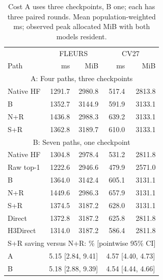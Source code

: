 \begin{table}[t]\centering\footnotesize
\caption{Cost A uses three checkpoints, B one; each has three paired rounds. Mean population-weighted ms; observed peak allocated MiB with both models resident.}\label{tab:cost}
\setlength{\tabcolsep}{4pt}\renewcommand{\arraystretch}{1.03}
\begin{tabular}{@{}lrrrr@{}}\toprule
 & \multicolumn{2}{c}{FLEURS} & \multicolumn{2}{c}{CV27}\\
Path & ms & MiB & ms & MiB\\\midrule
\multicolumn{5}{c}{A: Four paths, three checkpoints}\\
Native HF & 1291.7 & 2980.8 & 517.4 & 2813.8\\
B & 1352.7 & 3144.9 & 591.9 & 3133.1\\
N+R & 1436.8 & 2988.3 & 639.2 & 3133.1\\
S+R & 1362.8 & 3189.7 & 610.0 & 3133.1\\
\midrule
\multicolumn{5}{c}{B: Seven paths, one checkpoint}\\
Native HF & 1304.8 & 2978.4 & 531.2 & 2811.8\\
Raw top-1 & 1222.6 & 2946.6 & 479.9 & 2571.0\\
B & 1364.0 & 3142.4 & 605.1 & 3131.1\\
N+R & 1449.6 & 2986.3 & 657.9 & 3131.1\\
S+R & 1374.5 & 3187.2 & 628.0 & 3131.1\\
Direct & 1372.8 & 3187.2 & 625.8 & 2811.8\\
H3Direct & 1314.0 & 3187.2 & 586.4 & 2811.8\\
\midrule
\multicolumn{5}{c}{S+R saving versus N+R: \% [pointwise 95\% CI]}\\
A & \multicolumn{2}{c}{5.15 [2.84, 9.41]} & \multicolumn{2}{c}{4.57 [4.40, 4.73]}\\
B & \multicolumn{2}{c}{5.18 [2.88, 9.39]} & \multicolumn{2}{c}{4.54 [4.44, 4.66]}\\
\bottomrule\end{tabular}\end{table}
